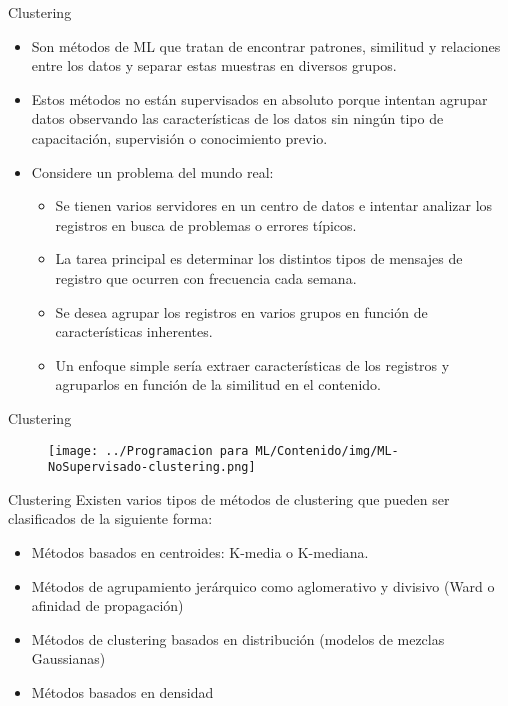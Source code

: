 \documentclass[11pt,aspectratio=169]{beamer}
\begin{document}
\begin{frame}{Clustering}
\begin{itemize}
	\item Son métodos de ML que tratan de encontrar patrones, similitud y relaciones entre los datos y separar estas muestras en diversos grupos.\pause
	\item Estos métodos no están supervisados en absoluto porque intentan agrupar datos observando las características de los datos sin ningún 
		tipo de capacitación, supervisión o conocimiento previo.\pause
	\item Considere un problema del mundo real:
		\begin{itemize}
			\item Se tienen varios servidores en un centro de datos e intentar analizar los registros en busca de problemas o errores típicos.\pause
			\item La tarea principal es determinar los distintos tipos de mensajes de registro que ocurren con frecuencia cada semana.\pause
			\item Se desea agrupar los registros en varios grupos en función de características inherentes. \pause
			\item Un enfoque simple sería extraer características de los registros y agruparlos en función de la similitud en el contenido. 
		\end{itemize}		  
\end{itemize}
\end{frame}

\begin{frame}{Clustering}
\begin{figure}[H]
	\centering
	\texttt{[image: ../Programacion para ML/Contenido/img/ML-NoSupervisado-clustering.png]}
\end{figure}
\end{frame}

\begin{frame}{Clustering}
Existen varios tipos de métodos de clustering que pueden ser clasificados de la siguiente forma:\pause
\begin{itemize}
	\item Métodos basados en centroides: K-media o K-mediana.\pause
	\item Métodos de agrupamiento jerárquico como aglomerativo y divisivo (Ward o afinidad de propagación)\pause
	\item Métodos de clustering basados en distribución (modelos de mezclas Gaussianas)\pause
	\item Métodos basados en densidad
\end{itemize}
\end{frame}
\end{document}
